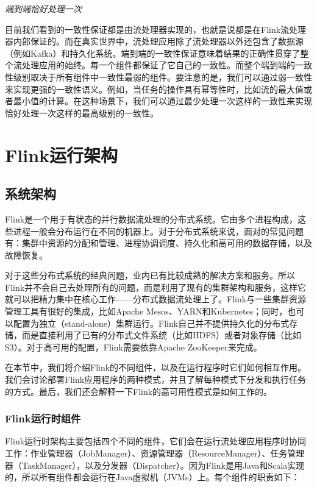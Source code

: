 \documentclass[cn,11pt,chinese]{elegantbook}
\begin{document}
\textit{端到端恰好处理一次}

目前我们看到的一致性保证都是由流处理器实现的，也就是说都是在Flink流处理器内部保证的。而在真实世界中，流处理应用除了流处理器以外还包含了数据源（例如Kafka）和持久化系统。端到端的一致性保证意味着结果的正确性贯穿了整个流处理应用的始终。每一个组件都保证了它自己的一致性。而整个端到端的一致性级别取决于所有组件中一致性最弱的组件。要注意的是，我们可以通过弱一致性来实现更强的一致性语义。例如，当任务的操作具有幂等性时，比如流的最大值或者最小值的计算。在这种场景下，我们可以通过最少处理一次这样的一致性来实现恰好处理一次这样的最高级别的一致性。

\chapter{Flink运行架构}

\section{系统架构}

Flink是一个用于有状态的并行数据流处理的分布式系统。它由多个进程构成，这些进程一般会分布运行在不同的机器上。对于分布式系统来说，面对的常见问题有：集群中资源的分配和管理、进程协调调度、持久化和高可用的数据存储，以及故障恢复。

对于这些分布式系统的经典问题，业内已有比较成熟的解决方案和服务。所以Flink并不会自己去处理所有的问题，而是利用了现有的集群架构和服务，这样它就可以把精力集中在核心工作——分布式数据流处理上了。Flink与一些集群资源管理工具有很好的集成，比如Apache Mesos、YARN和Kubernetes；同时，也可以配置为独立（stand-alone）集群运行。Flink自己并不提供持久化的分布式存储，而是直接利用了已有的分布式文件系统（比如HDFS）或者对象存储（比如S3）。对于高可用的配置，Flink需要依靠Apache ZooKeeper来完成。

在本节中，我们将介绍Flink的不同组件，以及在运行程序时它们如何相互作用。我们会讨论部署Flink应用程序的两种模式，并且了解每种模式下分发和执行任务的方式。最后，我们还会解释一下Flink的高可用性模式是如何工作的。

\subsection{Flink运行时组件}

Flink运行时架构主要包括四个不同的组件，它们会在运行流处理应用程序时协同工作：作业管理器（JobManager）、资源管理器（ResourceManager）、任务管理器（TaskManager），以及分发器（Dispatcher）。因为Flink是用Java和Scala实现的，所以所有组件都会运行在Java虚拟机（JVMs）上。每个组件的职责如下：
\end{document}
